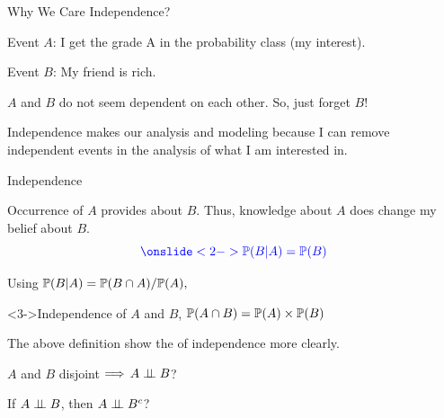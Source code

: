 \begin{frame}{Why We Care Independence?}

\plitemsep 0.1in
\bci 

\item<2-> Event $A$: I get the grade A in the probability class (my interest).
\item<2-> Event $B$: My friend is rich. 

\bigskip
\item<3-> $A$ and $B$ do not seem dependent on each other. So, just forget $B$!

\item<4-> Independence makes our analysis and modeling  because I can remove independent events in the analysis of what I am interested in.  
\eci 
\end{frame}


\begin{frame}{Independence}

\plitemsep 0.05in
\bci 

\item<1-> Occurrence of $A$ provides  about $B.$ Thus, knowledge about $A$ does  change my belief about $B.$ 
$$
\bluef{
\onslide<2->{
\cprob{B | A} = \cprob{B}
}}
$$


\item<3-> Using $\mathbb{P}( B | A ) = \mathbb{P}( B \cap A )/\mathbb{P}( A ),$ 

\begin{block}<3->{Independence of $A$ and $B$, }
$\mathbb{P}( A \cap B ) = \mathbb{P}( A ) \times \mathbb{P}( B )$
\end{block}

\item<4-> The above definition show the  of independence more clearly.

\item<5->  $A$ and $B$ disjoint $\Longrightarrow$ $A \perp \!\!\! \perp B$?


\item<7->  If $A \perp \!\!\! \perp B$,  then $A \perp \!\!\! \perp B^c$?  
\eci 
\end{frame}

